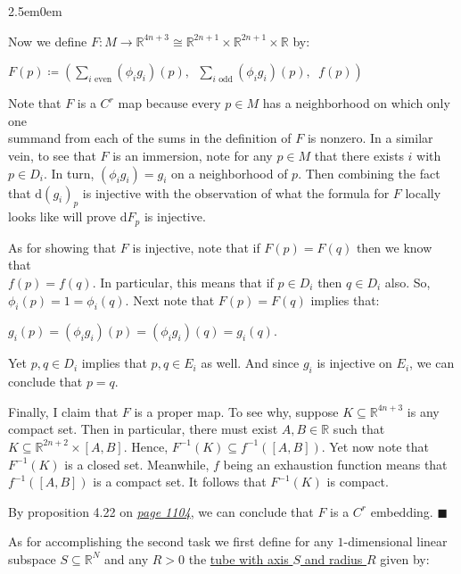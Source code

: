 \documentclass{book}
\newcommand{\inLinkRap}[2]{{\color{blue}\hyperlink{#1}{\textit{#2}}}}
\newcommand{\hTwo}{%
\color{Black}%
   \fontsize{13}{15}\selectfont%
}
\newenvironment{myIndent}{%
   \begin{adjustwidth}{2.5em}{0em}%
}{%
   \end{adjustwidth}%
}
\newcommand{\udefine}[1]{{%
   \setulcolor{Red}%
   \setul{0.14em}{0.07em}%
   \ul{#1}%
}}
\newcommand{\df}{\mathrm{d}}
\newcommand{\retTwo}{\hfill\bigbreak}
\begin{document}
\begin{myIndent}
	Now we define $F: M \to \mathbb{R}^{4n + 3} \cong \mathbb{R}^{2n + 1} \times \mathbb{R}^{2n + 1} \times \mathbb{R}$ by:
	
	{\centering$F(p) \coloneqq \left(\sum\limits_{i \text{ even}}(\phi_i g_i)(p),\phantom{a} \sum\limits_{i \text{ odd}}(\phi_i g_i)(p), \phantom{a} f(p)\right)$\retTwo\par}

	Note that $F$ is a $C^r$ map because every $p \in M$ has a neighborhood on which only one\\ summand from each of the sums in the definition of $F$ is nonzero. In a similar vein, to see that $F$ is an immersion, note for any $p \in M$ that there exists $i$ with $p \in D_i$. In turn, $(\phi_i g_i) = g_i$ on a neighborhood of $p$. Then combining the fact that $\df (g_i)_p$ is injective with the observation of what the formula for $F$ locally looks like will prove $\df F_p$ is injective.\retTwo

	As for showing that $F$ is injective, note that if $F(p) = F(q)$ then we know that\\ $f(p) = f(q)$. In particular, this means that if $p \in D_i$ then $q \in D_i$ also. So,\\ $\phi_i(p) = 1 = \phi_i(q)$. Next note that $F(p) = F(q)$ implies that:

	{\centering $g_i(p) = (\phi_i g_i)(p) = (\phi_i g_i)(q) = g_i(q)$.\retTwo\par}

	Yet $p, q \in D_i$ implies that $p, q \in E_i$ as well. And since $g_i$ is injective on $E_i$, we can\\ conclude that $p = q$.\retTwo

	Finally, I claim that $F$ is a proper map. To see why, suppose $K \subseteq \mathbb{R}^{4n + 3}$ is any compact set. Then in particular, there must exist $A, B \in \mathbb{R}$ such that $K \subseteq \mathbb{R}^{2n + 2} \times [A, B]$. Hence, $F^{-1}(K) \subseteq f^{-1}([A, B])$. Yet now note that $F^{-1}(K)$ is a closed set. Meanwhile, $f$ being an exhaustion function means that $f^{-1}([A, B])$ is a compact set. It follows that $F^{-1}(K)$ is compact.\retTwo

	By proposition 4.22 on \inLinkRap{Proposition 4.22 page 1104}{page 1104}, we can conclude that $F$ is a $C^r$ embedding. $\blacksquare$\retTwo
\end{myIndent}

\hTwo As for accomplishing the second task we first define for any $1$-dimensional linear subspace $S \subseteq \mathbb{R}^N$ and any $R > 0$ the \udefine{tube with axis $S$ and radius $R$} given by:
\end{document}
